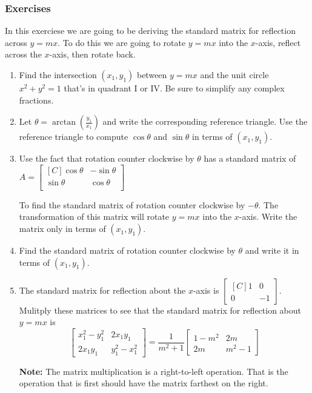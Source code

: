 \subsubsection{Exercises}
\begin{exercise}
In this exerciese we are going to be deriving the standard matrix for reflection across $y=mx$. To do this we are going to rotate $y=mx$ into the $x$-axis, 
reflect across the $x$-axis, then rotate back.
\begin{enumerate}
\item Find the intersection $(x_1,y_1)$ between $y=mx$ and the unit circle $x^2+y^2=1$ that's in quadrant I or IV. Be sure to simplify any complex fractions.
\item Let $\theta=\arctan \left(\frac{y_1}{x_1}\right)$ and write the corresponding reference triangle. Use the reference triangle to compute $\cos \theta$ and $\sin \theta$ in terms of $(x_1,y_1)$.
\item Use the fact that rotation counter clockwise by $\theta$ has a standard matrix of 
$A=\begin{bmatrix*}[C]
\cos \theta & -\sin \theta \\
\sin \theta & \cos \theta \\
\end{bmatrix*}$

To find the standard matrix of rotation counter clockwise by $-\theta$. 
The transformation of this matrix will rotate $y=mx$ into the $x$-axis. Write the matrix only in terms of $(x_1,y_1)$.

\item Find the standard matrix of rotation counter clockwise by $\theta$ and write it in terms of $(x_1,y_1)$.

\item The standard matrix for reflection about the $x$-axis is $\begin{bmatrix*}[C]1 & 0 \\ 0 & -1 \end{bmatrix*}$. Mulitply these matrices to see that the 
standard matrix for reflection about $y=mx$ is 
\[
\begin{bmatrix} x_1^2-y_1^2 & 2x_1y_1 \\ 2x_1y_1 & y_1^2-x_1^2\end{bmatrix}=\frac{1}{m^2+1}\begin{bmatrix} 1-m^2 & 2m \\ 2m & m^2-1\end{bmatrix}
\]

\textbf{Note:} The matrix multiplication is a right-to-left operation. That is the operation that is first should have the matrix farthest on the right.

\end{enumerate}
\end{exercise}


